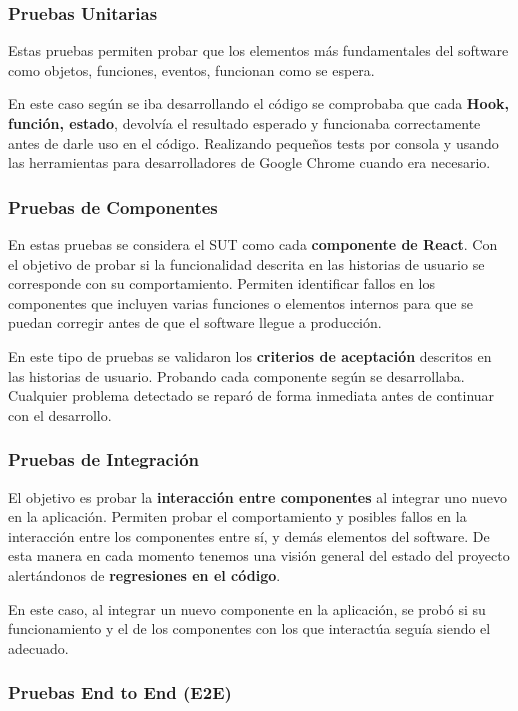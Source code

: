\documentclass[12pt,twoside,titlepage]{report}
\begin{document}
\subsubsection{Pruebas Unitarias}

Estas pruebas permiten probar que los elementos más fundamentales del software como objetos, funciones, eventos, funcionan como se espera. 

En este caso según se iba desarrollando el código se comprobaba que cada \textbf{Hook, función, estado}, devolvía el resultado esperado y funcionaba correctamente antes de darle uso en el código. 
Realizando pequeños tests por consola y usando las herramientas para desarrolladores de Google Chrome cuando era necesario.

\subsubsection{Pruebas de Componentes}

En estas pruebas se considera el SUT como cada \textbf{componente de React}. Con el objetivo de probar si la funcionalidad descrita en las historias de usuario se corresponde con su comportamiento.
Permiten identificar fallos en los componentes que incluyen varias funciones o elementos internos para que se puedan corregir antes de que el software llegue a producción. 

En este tipo de pruebas se validaron los \textbf{criterios de aceptación} descritos en las historias de usuario. Probando cada componente según se desarrollaba. Cualquier problema detectado se reparó de forma inmediata antes de continuar con el desarrollo.

\subsubsection{Pruebas de Integración}

El objetivo es probar la \textbf{interacción entre componentes} al integrar uno nuevo en la aplicación. Permiten probar el comportamiento y posibles fallos en la interacción entre los componentes entre sí, y demás elementos del software.
De esta manera en cada momento tenemos una visión general del estado del proyecto alertándonos de \textbf{regresiones en el código}.

En este caso, al integrar un nuevo componente en la aplicación, se probó si su funcionamiento y el de los componentes con los que interactúa seguía siendo el adecuado.

\subsubsection{Pruebas End to End (E2E)}
\end{document}
